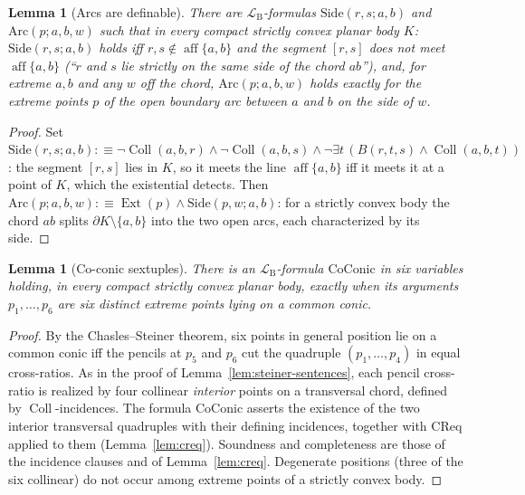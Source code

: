 \documentclass[11pt]{amsart}
\newtheorem{lemma}[theorem]{Lemma}
\theoremstyle{definition}
\newcommand{\LB}{\mathcal{L}_{\mathrm{B}}}
\newcommand{\Ext}{\operatorname{Ext}}
\newcommand{\Coll}{\operatorname{Coll}}
\newcommand{\aff}{\operatorname{aff}}
\begin{document}
\begin{lemma}[Arcs are definable]\label{lem:arc-def}
There are $\LB$-formulas $\mathrm{Side}(r,s;a,b)$ and
$\mathrm{Arc}(p;a,b,w)$ such that in every compact strictly convex planar
body $K$: $\mathrm{Side}(r,s;a,b)$ holds iff $r,s\notin\aff\{a,b\}$ and the
segment $[r,s]$ does not meet $\aff\{a,b\}$ (``$r$ and $s$ lie strictly on the
same side of the chord $ab$''), and, for extreme $a,b$ and any $w$ off the
chord, $\mathrm{Arc}(p;a,b,w)$ holds exactly for the extreme points $p$ of the
open boundary arc between $a$ and $b$ on the side of $w$.
\end{lemma}

\begin{proof}
Set $\mathrm{Side}(r,s;a,b):\equiv\neg\Coll(a,b,r)\wedge\neg\Coll(a,b,s)
\wedge\neg\exists t\,(B(r,t,s)\wedge\Coll(a,b,t))$: the segment $[r,s]$ lies
in $K$, so it meets the line $\aff\{a,b\}$ iff it meets it at a point of $K$,
which the existential detects. Then
$\mathrm{Arc}(p;a,b,w):\equiv\Ext(p)\wedge\mathrm{Side}(p,w;a,b)$: for a
strictly convex body the chord $ab$ splits $\partial K\setminus\{a,b\}$ into
the two open arcs, each characterized by its side.
\end{proof}

\begin{lemma}[Co-conic sextuples]
\label{lem:coconic}
There is an $\LB$-formula $\mathrm{CoConic}$ in six variables holding, in
every compact strictly convex planar body, exactly when its arguments
$p_1,\dots,p_6$ are six distinct extreme points lying on a common conic.
\end{lemma}

\begin{proof}
By the Chasles--Steiner theorem, six points in general position lie on a
common conic iff the pencils at $p_5$ and $p_6$ cut the quadruple
$(p_1,\dots,p_4)$ in equal cross-ratios. As in the proof of
Lemma~\ref{lem:steiner-sentences}, each pencil cross-ratio is realized by four
collinear \emph{interior} points on a transversal chord, defined by
$\Coll$-incidences. The formula $\mathrm{CoConic}$ asserts the existence of
the two interior transversal quadruples with their defining incidences,
together with $\mathrm{CReq}$ applied to them (Lemma~\ref{lem:creq}).
Soundness and completeness are those of the incidence clauses and of
Lemma~\ref{lem:creq}. Degenerate positions (three of the six collinear) do
not occur among extreme points of a strictly convex body.
\end{proof}
\end{document}
